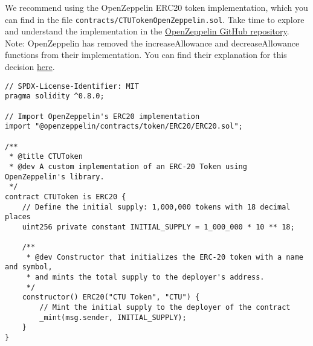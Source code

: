 \documentclass[12pt]{article}
\begin{document}
We recommend using the OpenZeppelin ERC20 token implementation, which you can find in the file \texttt{contracts/CTUTokenOpenZeppelin.sol}.
Take time to explore and understand the implementation in the \href{https://github.com/OpenZeppelin/openzeppelin-contracts/blob/master/contracts/token/ERC20/ERC20.sol}{OpenZeppelin GitHub repository}. Note: OpenZeppelin has removed the increaseAllowance and decreaseAllowance functions from their implementation. You can find their explanation for this decision \href{https://github.com/OpenZeppelin/openzeppelin-contracts/issues/4583}{here}.

\noindent
\begin{minipage}{\textwidth}
\begin{lstlisting}[language=Solidity]
// SPDX-License-Identifier: MIT
pragma solidity ^0.8.0;

// Import OpenZeppelin's ERC20 implementation
import "@openzeppelin/contracts/token/ERC20/ERC20.sol";

/**
 * @title CTUToken
 * @dev A custom implementation of an ERC-20 Token using OpenZeppelin's library.
 */
contract CTUToken is ERC20 {
    // Define the initial supply: 1,000,000 tokens with 18 decimal places
    uint256 private constant INITIAL_SUPPLY = 1_000_000 * 10 ** 18;

    /**
     * @dev Constructor that initializes the ERC-20 token with a name and symbol,
     * and mints the total supply to the deployer's address.
     */
    constructor() ERC20("CTU Token", "CTU") {
        // Mint the initial supply to the deployer of the contract
        _mint(msg.sender, INITIAL_SUPPLY);
    }
}
\end{lstlisting}
\end{minipage}
\end{document}
